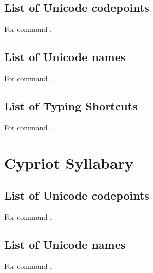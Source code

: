 \subsection{List of Unicode codepoints}
For command \codedetok{\cutransuc{}}.
\begin{multicols}{4}\noindent
\cutag
\cushowplainlistuc
\eolist
\end{multicols}

\subsection{List of Unicode names}
For command \codedetok{\cutransun{}}.
\begin{multicols}{2}\noindent
\cutag
\cushowplainlistun
\eolist
\end{multicols}

\subsection{List of Typing Shortcuts}
For command \codedetok{\cutransts{}}.
\begin{multicols}{4}\noindent
\cutag
\cushowplainlistts
\eolist
\end{multicols}
%





\section{Cypriot Syllabary}


\subsection{List of Unicode codepoints}
For command \codedetok{\cytransuc{}}.
\begin{multicols}{4}\noindent
\cytag
\cyshowplainlistuc
\eolist
\end{multicols}

\subsection{List of Unicode names}
For command \codedetok{\cytransun{}}.
\begin{multicols}{4}\noindent
\cytag
\cyshowplainlistun
\eolist
\end{multicols}

